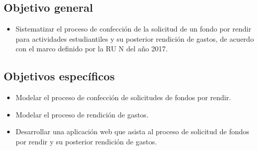 \subsection{Objetivo general}
    \begin{itemize}
        \item Sistematizar el proceso de confección de la solicitud de un fondo por rendir para actividades estudiantiles y su posterior rendición de gastos, de acuerdo con el marco definido por la RU N del año 2017.
    \end{itemize}

\subsection{Objetivos específicos} 
    \begin{itemize}
        \item Modelar el proceso de confección de solicitudes de fondos por rendir.

        \item Modelar el proceso de rendición de gastos.

        \item Desarrollar una aplicación web que asista al proceso de solicitud de fondos por rendir y su posterior rendición de gastos.

    \end{itemize}
